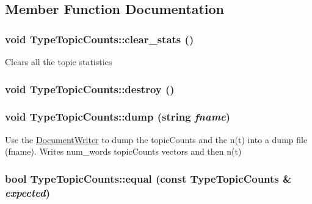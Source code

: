 \subsection{Member Function Documentation}
\hypertarget{class_type_topic_counts_a0e039d80803bd0d1310d8d34478651ec}{
\subsubsection[{clear\_\-stats}]{\setlength{\rightskip}{0pt plus 5cm}void TypeTopicCounts::clear\_\-stats ()}}
\label{class_type_topic_counts_a0e039d80803bd0d1310d8d34478651ec}
Clears all the topic statistics \hypertarget{class_type_topic_counts_a0ed91f07819b6534de5592d22e6278d3}{
\subsubsection[{destroy}]{\setlength{\rightskip}{0pt plus 5cm}void TypeTopicCounts::destroy ()}}
\label{class_type_topic_counts_a0ed91f07819b6534de5592d22e6278d3}
\hypertarget{class_type_topic_counts_ad5b4a0efaccdf397d696ef3a59ff5bc5}{
\subsubsection[{dump}]{\setlength{\rightskip}{0pt plus 5cm}void TypeTopicCounts::dump (string {\em fname})}}
\label{class_type_topic_counts_ad5b4a0efaccdf397d696ef3a59ff5bc5}
Use the \hyperlink{class_document_writer}{DocumentWriter} to dump the topicCounts and the n(t) into a dump file (fname). Writes num\_\-words topicCounts vectors and then n(t) \hypertarget{class_type_topic_counts_aca203c070ed5c7338ebfe7b2b2574ae4}{
\subsubsection[{equal}]{\setlength{\rightskip}{0pt plus 5cm}bool TypeTopicCounts::equal (const {\bf TypeTopicCounts} \& {\em expected})}}
